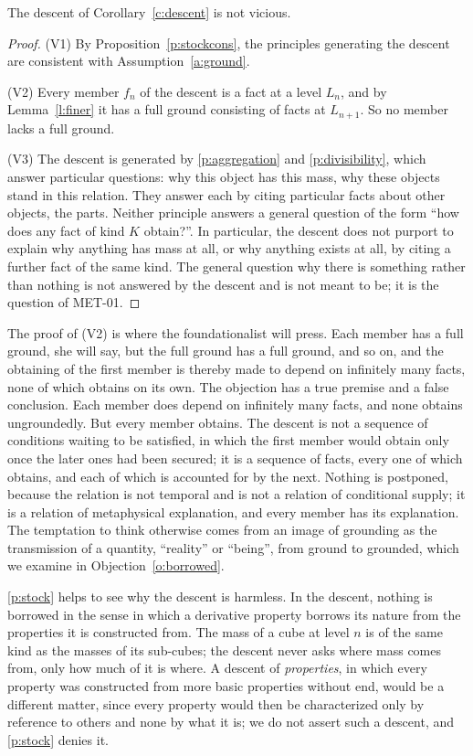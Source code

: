 \documentclass{situationist-preprint}
\begin{document}
\begin{theorem}\label{t:benign}
The descent of Corollary~\ref{c:descent} is not vicious.
\end{theorem}

\begin{proof}
(V1) By Proposition~\ref{p:stockcons}, the principles generating the descent are consistent with Assumption~\ref{a:ground}.

(V2) Every member $f_n$ of the descent is a fact at a level $L_n$, and by Lemma~\ref{l:finer} it has a full ground consisting of facts at $L_{n+1}$. So no member lacks a full ground.

(V3) The descent is generated by \ref{p:aggregation} and \ref{p:divisibility}, which answer particular questions: why this object has this mass, why these objects stand in this relation. They answer each by citing particular facts about other objects, the parts. Neither principle answers a general question of the form \enquote{how does any fact of kind $K$ obtain?}. In particular, the descent does not purport to explain why anything has mass at all, or why anything exists at all, by citing a further fact of the same kind. The general question why there is something rather than nothing is not answered by the descent and is not meant to be; it is the question of MET-01.
\end{proof}

The proof of (V2) is where the foundationalist will press. Each member has a full ground, she will say, but the full ground has a full ground, and so on, and the obtaining of the first member is thereby made to depend on infinitely many facts, none of which obtains on its own. The objection has a true premise and a false conclusion. Each member does depend on infinitely many facts, and none obtains ungroundedly. But every member obtains. The descent is not a sequence of conditions waiting to be satisfied, in which the first member would obtain only once the later ones had been secured; it is a sequence of facts, every one of which obtains, and each of which is accounted for by the next. Nothing is postponed, because the relation is not temporal and is not a relation of conditional supply; it is a relation of metaphysical explanation, and every member has its explanation. The temptation to think otherwise comes from an image of grounding as the transmission of a quantity, \enquote{reality} or \enquote{being}, from ground to grounded, which we examine in Objection~\ref{o:borrowed}.

\ref{p:stock} helps to see why the descent is harmless. In the descent, nothing is borrowed in the sense in which a derivative property borrows its nature from the properties it is constructed from. The mass of a cube at level $n$ is of the same kind as the masses of its sub-cubes; the descent never asks where mass comes from, only how much of it is where. A descent of \emph{properties}, in which every property was constructed from more basic properties without end, would be a different matter, since every property would then be characterized only by reference to others and none by what it is; we do not assert such a descent, and \ref{p:stock} denies it.
\end{document}
